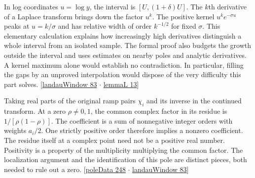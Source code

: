 \documentclass[12pt,letterpaper]{article}
\begin{document}
In log coordinates $u=\log y$, the interval is $[U,(1+\delta)U]$. The $k$th derivative of a Laplace transform brings down the factor $u^k$. The positive kernel $u^k e^{-\sigma u}$ peaks at $u=k/\sigma$ and has relative width of order $k^{-1/2}$ for fixed $\sigma$. This elementary calculation explains how increasingly high derivatives distinguish a whole interval from an isolated sample. The formal proof also budgets the growth outside the interval and uses estimates on nearby poles and analytic derivatives. A kernel maximum alone would establish no contradiction. In particular, filling the gaps by an unproved interpolation would dispose of the very difficulty this part solves. {\small\sffamily\color{mute}[\href{https://github.com/nousentllc/riemann-hypothesis/blob/40e56bab026552e089d7afcfeff08d2defb9c005/src/Development/AutomorphicArithmetic/DedekindLFunctions/LandauTheorems/landauWindow.lean#L83}{landauWindow 83} $\cdot$ \href{https://github.com/nousentllc/riemann-hypothesis/blob/40e56bab026552e089d7afcfeff08d2defb9c005/src/Development/AutomorphicArithmetic/DedekindLFunctions/LandauTheorems/lemmaL.lean#L13}{lemmaL 13}]}

Taking real parts of the original ramp pairs $\chi_i$ and its inverse in the continued transform. At a zero $\rho\ne0,1$, the common complex factor in its residue is $1/[\rho(1-\rho)]$. The coefficient is a sum of nonnegative integer orders with weights $a_i/2$. One strictly positive order therefore implies a nonzero coefficient. The residue itself at a complex point need not be a positive real number. Positivity is a property of the multiplicity multiplying the common factor. The localization argument and the identification of this pole are distinct pieces, both needed to rule out a zero. {\small\sffamily\color{mute}[\href{https://github.com/nousentllc/riemann-hypothesis/blob/40e56bab026552e089d7afcfeff08d2defb9c005/src/Development/AutomorphicArithmetic/DedekindLFunctions/LandauTheorems/poleData.lean#L248}{poleData 248} $\cdot$ \href{https://github.com/nousentllc/riemann-hypothesis/blob/40e56bab026552e089d7afcfeff08d2defb9c005/src/Development/AutomorphicArithmetic/DedekindLFunctions/LandauTheorems/landauWindow.lean#L83}{landauWindow 83}]}
\end{document}

